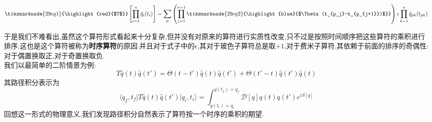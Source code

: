 \begin{equation}
    \vspace{\baselineskip}
    \tikzmarknode{29eq1}{\highlight{red}{$T$}}\left[\prod_{i=1}^n\hat{q}_i(t_i)\right]=\sum_p\left(\prod_{j=1}^{n-1}\tikzmarknode{29eq2}{\highlight{blue}{$\Theta(t_{p_j}-t_{p_{j+1}})$}}\right)\epsilon\prod_{k=1}^{n}\hat{q}_{pk}(t_{pk})
\end{equation}

于是我们不难看出,虽然这个算符形式看起来十分复杂,但并没有对原来的算符进行实质性改变,只不过是按照时间顺序把这些算符的乘积进行排序,这也是这个算符被称为\textbf{时序算符}的原因.并且对于式子中的$\epsilon$,其对于玻色子算符总是取$+1$,对于费米子算符,其依赖于前面的排序的奇偶性:对于偶置换取正,对于奇置换取负.\\
我们以最简单的二阶情景为例:
\begin{equation}
    T\hat{q}(t)\hat{q}(t')=\Theta(t-t')\hat{q}(t)\hat{q}(t')+\Theta(t'-t)\hat{q}(t')\hat{q}(t)
\end{equation}
其路径积分表示为
\begin{equation}
    \langle q_f,t_f|T\hat{q}(t)\hat{q}(t')|q_i,t_i\rangle=\int_{q(t_i)=q_i}^{q(t_f)=q_f}\mathcal{D}[q] q(t)q(t')e^{iS[q]}
\end{equation}
回想这一形式的物理意义,我们发现路径积分自然表示了算符按一个时序的乘积的期望.

